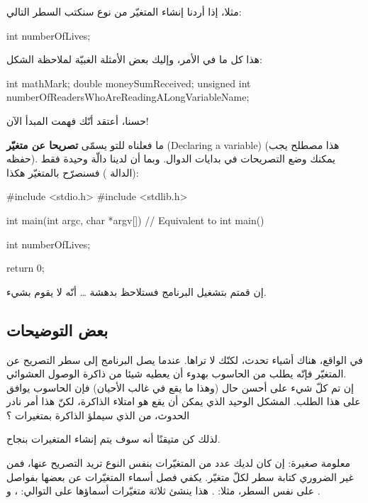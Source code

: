  مثلا، إذا أردنا إنشاء المتغيّر
 من نوع
سنكتب السطر التالي:

\begin{Csource}
int numberOfLives;
\end{Csource}

هذا كل ما في الأمر، وإليك بعض الأمثلة الغبيّة لملاحظة الشكل:

\begin{Csource}
int mathMark;
double moneySumReceived;
unsigned int numberOfReadersWhoAreReadingALongVariableName;
\end{Csource}

حسنا، أعتقد أنّك فهمت المبدأ الآن!

ما فعلناه للتو يسمّى
\textbf{تصريحا عن متغيّر}
(\textenglish{Declaring a variable})
(هذا مصطلح يجب حفظه). يمكنك وضع التصريحات في بدايات الدوال. وبما أن لدينا دالّة وحيدة فقط
(الدالة
)
فسنصرّح بالمتغيّر هكذا:

\begin{Csource}
#include <stdio.h>
#include <stdlib.h>

int main(int argc, char *argv[]) // Equivalent to int main()
{
  int numberOfLives;

  return 0;
}
\end{Csource}

إن قمتم بتشغيل البرنامج فستلاحظ بدهشة 
\dots
أنّه لا يقوم بشيء.

\subsection{بعض التوضيحات}

في الواقع، هناك أشياء تحدث، لكنّك لا تراها. عندما يصل البرنامج إلى سطر التصريح عن المتغيّر فإنّه يطلب من الحاسوب بهدوء أن يعطيه شيئا من ذاكرة الوصول العشوائي.\\
إن تم كلّ شيء على أحسن حال (وهذا ما يقع في غالب الأحيان) فإن الحاسوب يوافق على هذا الطلب.
المشكل الوحيد الذي يمكن أن يقع هو امتلاء الذاكرة، لكنّ هذا أمر نادر الحدوث، من الذي سيملؤ الذاكرة بمتغيرات
 ؟

لذلك كن متيقنًا أنه سوف يتم إنشاء المتغيرات بنجاح.

\begin{information}
  معلومة صغيرة: إن كان لديك عدد من المتغيّرات بنفس النوع تريد التصريح عنها، فمن غير الضروري كتابة سطر لكلّ متغيّر. يكفي فصل أسماء المتغيّرات عن بعضها بفواصل على نفس السطر، مثلا:
.
هذا ينشئ ثلاثة متغيّرات أسماؤها على التوالي:
، 
و
.
\end{information}


